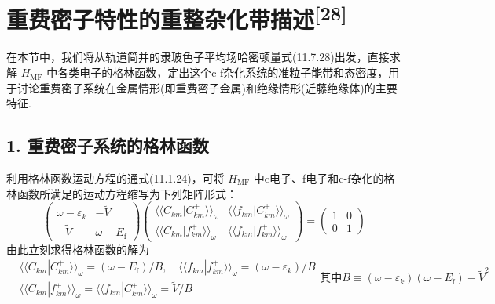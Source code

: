 \section{\texorpdfstring{重费密子特性的重整杂化带描述\textsuperscript{[28]}}{重费密子特性的重整杂化带描述[28]}}

在本节中，我们将从轨道简并的隶玻色子平均场哈密顿量式(11.7.28)出发，直接求解 $H_{\mathrm{MF}}$ 中各类电子的格林函数，定出这个c-f杂化系统的准粒子能带和态密度，用于讨论重费密子系统在金属情形(即重费密子金属)和绝缘情形(近藤绝缘体)的主要特征.

\subsection*{1. 重费密子系统的格林函数}

利用格林函数运动方程的通式(11.1.24)，可将 $H_{\mathrm{MF}}$ 中c电子、f电子和c-f杂化的格林函数所满足的运动方程缩写为下列矩阵形式：
\begin{equation}
\begin{pmatrix}
  \omega-\varepsilon_{k} & -\widetilde{V}\\
  -\widetilde{V} & \omega-E_{\mathrm{f}}
\end{pmatrix}
\begin{pmatrix}
  \langle\langle C_{km}|C_{km}^{+}\rangle\rangle_{\omega} &
  \langle\langle f_{km}|C_{km}^{+}\rangle\rangle_{\omega}\\
  \langle\langle C_{km}|f_{km}^{+}\rangle\rangle_{\omega} &
  \langle\langle f_{km}|f_{km}^{+}\rangle\rangle_{\omega}
\end{pmatrix}
=
\begin{pmatrix}
  1 & 0\\
  0 & 1
\end{pmatrix}
\end{equation}
由此立刻求得格林函数的解为
\begin{subequations}
\begin{equation}
\begin{aligned}
  &\langle\langle C_{km}|C_{km}^{+}\rangle\rangle_{\omega}=(\omega-E_{\mathrm{f}})/B,\quad
   \langle\langle f_{km}|f_{km}^{+}\rangle\rangle_{\omega}=(\omega-\varepsilon_{k})/B\\
  &\langle\langle C_{km}|f_{km}^{+}\rangle\rangle_{\omega}
   =\langle\langle f_{km}|C_{km}^{+}\rangle\rangle_{\omega}=\widetilde{V}/B
\end{aligned}
\end{equation}
其中
\begin{equation}
  B\equiv(\omega-\varepsilon_{k})(\omega-E_{\mathrm{f}})-\widetilde{V}^{2}
\end{equation}
\end{subequations}
